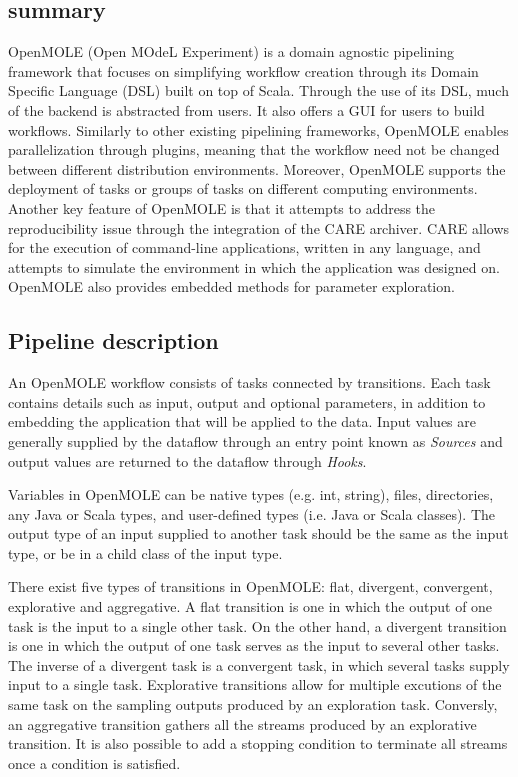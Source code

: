 \documentclass{report}
\begin{document}
        \subsection{summary}
        OpenMOLE (Open MOdeL Experiment) is a domain agnostic pipelining
framework that focuses on simplifying workflow creation through its Domain
Specific Language (DSL) built on top of Scala. Through the use of its DSL, much
of the backend is abstracted from users. It also offers a GUI for users to build
workflows. Similarly to other existing pipelining
frameworks, OpenMOLE enables parallelization through plugins, meaning that the
workflow need not be changed between different distribution environments.
Moreover, OpenMOLE supports the deployment of tasks or groups of tasks on different
computing environments.
Another key feature of OpenMOLE is that it attempts to address the
reproducibility issue through the integration of the CARE archiver. CARE allows
for the execution of command-line applications, written in any language, and
attempts to simulate the environment in which the application was designed on.
OpenMOLE also provides embedded methods for parameter exploration.

        \subsection{Pipeline description}
       An OpenMOLE workflow consists of tasks connected by transitions. Each
task contains details such as input, output and optional parameters, in addition
to embedding the application that will be applied to the data. Input values are
generally supplied by the dataflow through an entry point known as
\textit{Sources} and output values are returned to the
dataflow through \textit{Hooks}.   

      Variables in OpenMOLE can be native types (e.g. int, string), files,
directories, any Java or Scala types, and user-defined types (i.e. Java or Scala
classes). The output type of an input supplied to another task should be the
same as the input type, or be in a child class of the input type.

      There exist five types of transitions in OpenMOLE: flat, divergent,
convergent, explorative and aggregative. A flat transition is one in which the output of one
task is the input to a single other task. On the other hand, a divergent
transition is one in which the output of one task serves as the input to several
other tasks. The inverse of a divergent task is a convergent task, in which
several tasks supply input to a single task. Explorative transitions allow for
multiple excutions of the same task on the sampling outputs produced by an
exploration task. Conversly, an aggregative transition gathers all the streams
produced by an explorative transition. It is also possible to add a stopping
condition to terminate all streams once a condition is satisfied.
\end{document}
